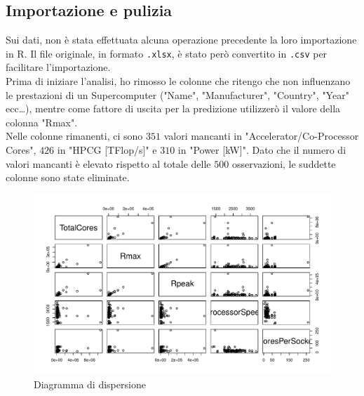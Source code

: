 \documentclass[11pt,a4paper]{article}
\begin{document}
\subsection{Importazione e pulizia}
Sui dati, non \`e stata effettuata alcuna operazione precedente la loro
importazione in R. Il file originale, in formato \texttt{.xlsx}, \`e stato
per\`o convertito in \texttt{.csv} per facilitare l'importazione.\\
Prima di iniziare l'analisi, ho rimosso le colonne che ritengo che non
influenzano le prestazioni di un Supercomputer ("Name", "Manufacturer",
"Country", "Year" ecc\dots), mentre come fattore di
uscita per la predizione utilizzer\`o il valore della colonna "Rmax".\\
Nelle colonne rimanenti, ci sono $351$ valori mancanti in
"Accelerator/Co-Processor Cores", $426$ in "HPCG [TFlop/s]" e $310$ in
"Power [kW]". Dato che il numero di valori mancanti \`e elevato rispetto al
totale delle $500$ osservazioni, le suddette colonne sono state eliminate.
\begin{figure}
	\vspace{-0.5cm}
	\centering
	\includegraphics[scale=0.7]{imgs/plot(data).pdf}
	\vspace{-0.4cm}
	\caption{Diagramma di dispersione}
\end{figure}
\clearpage
\end{document}
